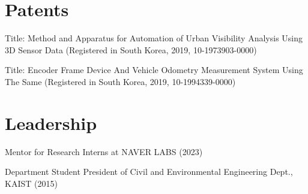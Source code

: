 \documentclass{cv} %
\begin{document}
\section{Patents}

\vspace{1mm}
\begin{pubSubsectionNum}{}

    \item Title: Method and Apparatus for Automation of Urban Visibility Analysis Using 3D Sensor Data (Registered in South Korea, 2019, 10-1973903-0000)
    \vspace{-1mm}
    \item Title: Encoder Frame Device And Vehicle Odometry Measurement System Using The Same (Registered in South Korea, 2019, 10-1994339-0000)

\end{pubSubsectionNum}

\section{Leadership}

\vspace{1mm}
\begin{pubSubsectionNum}{}
    \item Mentor for Research Interns at NAVER LABS (2023)
    \vspace{-1mm}
    \item Department Student President of Civil and Environmental Engineering Dept., KAIST (2015)
\end{pubSubsectionNum}

\end{document}

